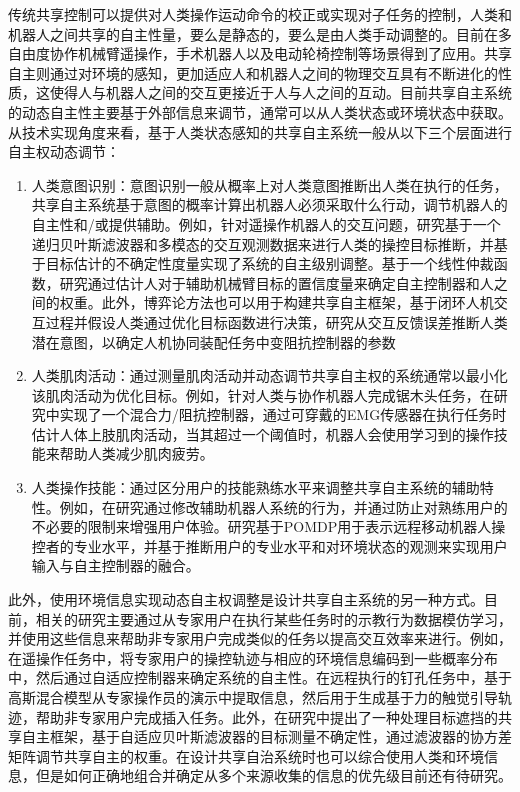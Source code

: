 传统共享控制可以提供对人类操作运动命令的校正或实现对子任务的控制，人类和机器人之间共享的自主性量，要么是静态的，要么是由人类手动调整的。目前在多自由度协作机械臂遥操作\cite{kronhardtUnderstandingSharedControl2023}，手术机器人\cite{zhangHumanRobotSharedControl2022}以及电动轮椅控制\cite{qinanliDynamicSharedControl2011}等场景得到了应用。共享自主则通过对环境的感知，更加适应人和机器人之间的物理交互具有不断进化的性质，这使得人与机器人之间的交互更接近于人与人之间的互动。目前共享自主系统的动态自主性主要基于外部信息来调节，通常可以从人类状态或环境状态中获取。从技术实现角度来看，基于人类状态感知的共享自主系统一般从以下三个层面进行自主权动态调节：
\begin{enumerate}
\item 人类意图识别：意图识别一般从概率上对人类意图推断出人类在执行的任务，共享自主系统基于意图的概率计算出机器人必须采取什么行动，调节机器人的自主性和/或提供辅助。例如，针对遥操作机器人的交互问题，研究\cite{jainProbabilisticHumanIntent2020}基于一个递归贝叶斯滤波器和多模态的交互观测数据来进行人类的操控目标推断，并基于目标估计的不确定性度量实现了系统的自主级别调整。基于一个线性仲裁函数，研究\cite{gopinathHumanintheLoopOptimizationShared2017}通过估计人对于辅助机械臂目标的置信度量来确定自主控制器和人之间的权重。此外，博弈论方法也可以用于构建共享自主框架，基于闭环人机交互过程并假设人类通过优化目标函数进行决策，研究\cite{liFrameworkHumanRobot2016,liContinuousRoleAdaptation2015}从交互反馈误差推断人类潜在意图，以确定人机协同装配任务中变阻抗控制器的参数
\item 人类肌肉活动：通过测量肌肉活动并动态调节共享自主权的系统通常以最小化该肌肉活动为优化目标。例如，针对人类与协作机器人完成锯木头任务，在研究\cite{peternelAdaptationRobotPhysical2016}中实现了一个混合力/阻抗控制器，通过可穿戴的EMG传感器在执行任务时估计人体上肢肌肉活动，当其超过一个阈值时，机器人会使用学习到的操作技能来帮助人类减少肌肉疲劳。
\item 人类操作技能：通过区分用户的技能熟练水平来调整共享自主系统的辅助特性。例如，在研究\cite{enayatiSkillbasedHumanRobot2018}通过修改辅助机器人系统的行为，并通过防止对熟练用户的不必要的限制来增强用户体验。研究\cite{millikenModelingUserExpertise2017}基于POMDP用于表示远程移动机器人操控者的专业水平，并基于推断用户的专业水平和对环境状态的观测来实现用户输入与自主控制器的融合。
\end{enumerate}

此外，使用环境信息实现动态自主权调整是设计共享自主系统的另一种方式。目前，相关的研究主要通过从专家用户在执行某些任务时的示教行为数据模仿学习，并使用这些信息来帮助非专家用户完成类似的任务以提高交互效率来进行。例如，在遥操作任务中，将专家用户的操控轨迹与相应的环境信息编码到一些概率分布中，然后通过自适应控制器来确定系统的自主性\cite{abi-farrajLearningbasedSharedControl2017}。在远程执行的钉孔任务中，基于高斯混合模型从专家操作员的演示中提取信息，然后用于生成基于力的触觉引导轨迹，帮助非专家用户完成插入任务\cite{perez-del-pulgarUsingLearningDemonstration2016}。此外，在研究\cite{balachandranAdaptiveAuthorityAllocation2020a}中提出了一种处理目标遮挡的共享自主框架，基于自适应贝叶斯滤波器的目标测量不确定性，通过滤波器的协方差矩阵调节共享自主的权重。在设计共享自治系统时也可以综合使用人类和环境信息，但是如何正确地组合并确定从多个来源收集的信息的优先级目前还有待研究。

